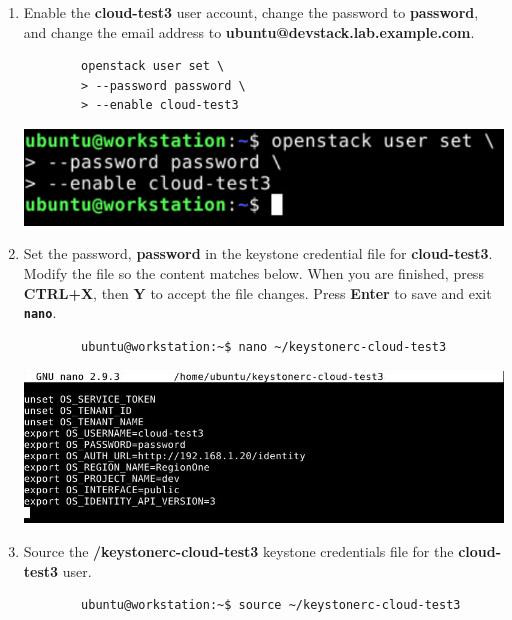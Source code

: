 \documentclass[letterpaper, 12pt]{article}
\begin{document}
\begin{enumerate}
    \item Enable the \textbf{cloud-test3} user account, change the password to \textbf{password}, and change the email
    address to \textbf{ubuntu@devstack.lab.example.com}.    
    \begin{lstlisting}
        openstack user set \
        > --password password \
        > --enable cloud-test3
    \end{lstlisting}

    \begin{center}
        \includegraphics[width=\linewidth]{images/part4/step15.png}
    \end{center}

    \item Set the password, \textbf{password} in the keystone credential file for \textbf{cloud-test3}. Modify the file
    so the content matches below. When you are finished, press \textbf{CTRL+X}, then \textbf{Y} to accept the file
    changes. Press \textbf{Enter} to save and exit \textbf{\texttt{nano}}.
    \begin{lstlisting}
        ubuntu@workstation:~$ nano ~/keystonerc-cloud-test3
    \end{lstlisting}

    \begin{center}
        \includegraphics[width=\linewidth]{images/part4/step16.png}
    \end{center}

    \item Source the \textbf{\texttildemid/keystonerc-cloud-test3} keystone credentials file for the
    \textbf{cloud-test3} user.
    \begin{lstlisting}
        ubuntu@workstation:~$ source ~/keystonerc-cloud-test3
    \end{lstlisting}


\end{enumerate}
\end{document}
